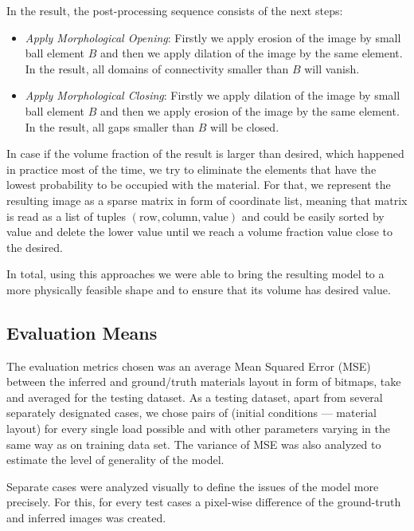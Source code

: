 In the result, the post-processing sequence consists of the next steps:
\begin{itemize}
	\item \emph{Apply Morphological Opening}: Firstly we apply erosion of the image by small ball element $B$ and then we apply dilation of the image by the same element. In the result, all domains of connectivity smaller than $B$ will vanish.
	\item \emph{Apply Morphological Closing}: Firstly we apply dilation of the image by small ball element $B$ and then we apply erosion of the image by the same element. In the result, all gaps smaller than $B$ will be closed.
\end{itemize}
\medskip

In case if the volume fraction of the result is larger than desired, which happened in practice most of the time, we try to eliminate the elements that have the lowest probability to be occupied with the material.
For that, we represent the resulting image as a sparse matrix in form of coordinate list, meaning that matrix is read as a list of tuples $(\mathrm{row},\mathrm{column},\mathrm{value})$ and could be easily sorted by value and delete the lower value until we reach a volume fraction value close to the desired.
\medskip

In total, using this approaches we were able to bring the resulting model to a more physically feasible shape and to ensure that its volume has desired value.
\medskip
{}


\subsection{Evaluation Means}

The evaluation metrics chosen was an average Mean Squared Error (MSE) between the inferred and ground/truth materials layout in form of bitmaps, take and averaged for the testing dataset. 
As a testing dataset, apart from several separately designated cases, we chose pairs of (initial conditions --- material layout) for every single load possible and with other parameters varying in the same way as on training data set.
The variance of MSE was also analyzed to estimate the level of generality of the model.

Separate cases were analyzed visually to define the issues of the model more precisely.
For this, for  every test cases a pixel-wise difference of the ground-truth and inferred images was created.


